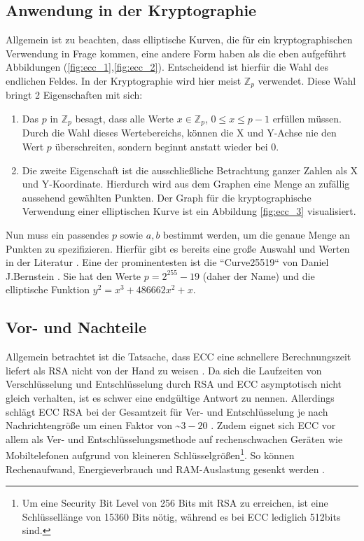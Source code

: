 \documentclass{scrreprt}
\begin{document}
\subsection{Anwendung in der Kryptographie}
Allgemein ist zu beachten, dass elliptische Kurven, die für ein kryptographischen Verwendung in Frage kommen, eine andere Form haben als die eben aufgeführt Abbildungen (\ref{fig:ecc_1},\ref{fig:ecc_2}). Entscheidend ist hierfür die Wahl des endlichen Feldes. In der Kryptographie wird hier meist $\mathbb{Z}_p$ verwendet. Diese Wahl bringt 2 Eigenschaften mit sich:
\begin{enumerate}
    \item Das $p$ in $\mathbb{Z}_p$ besagt, dass alle Werte $x \in \mathbb{Z}_p$, $0 \leq x \leq p-1$ erfüllen müssen. Durch die Wahl dieses Wertebereichs, können die X und Y-Achse nie den Wert $p$ überschreiten, sondern beginnt anstatt wieder bei 0.
    \item Die zweite Eigenschaft ist die ausschließliche Betrachtung ganzer Zahlen als X und Y-Koordinate. Hierdurch wird aus dem Graphen eine Menge an zufällig aussehend gewählten Punkten. Der Graph für die kryptographische Verwendung einer elliptischen Kurve ist ein Abbildung \ref{fig:ecc_3} visualisiert.
\end{enumerate}
Nun muss ein passendes $p$ sowie $a,b$ bestimmt werden, um die genaue Menge an Punkten zu spezifizieren. Hierfür gibt es bereits eine große Auswahl und Werten in der Literatur \cite{ecc-lochter2010elliptic}\cite{ecc-merkle2013elliptic}. Eine der prominentesten ist die ``Curve25519`` von Daniel J.Bernstein \cite{ecc-bernstein2006curve25519}. Sie hat den Werte $p=2^{255}-19$ (daher der Name) und die elliptische Funktion $y^2=x^3+486662x^2+x$.


\subsection{Vor- und Nachteile}
Allgemein betrachtet ist die Tatsache, dass ECC eine schnellere Berechnungszeit liefert als RSA nicht von der Hand zu weisen \cite{ecc-cloud2013elliptic}. Da sich die Laufzeiten von Verschlüsselung und Entschlüsselung durch RSA und ECC asymptotisch nicht gleich verhalten, ist es schwer eine endgültige Antwort zu nennen. Allerdings schlägt ECC RSA bei der Gesamtzeit für Ver- und Entschlüsselung je nach Nachrichtengröße um einen Faktor von \textasciitilde $3-20$ \cite{ecc-mahto2018performance}\cite{ecc-bao2022research}. Zudem eignet sich ECC vor allem als Ver- und Entschlüsselungsmethode auf rechenschwachen Geräten wie Mobiltelefonen aufgrund von kleineren Schlüsselgrößen\footnote{Um eine Security Bit Level von 256 Bits mit RSA zu erreichen, ist eine Schlüssellänge von 15360 Bits nötig, während es bei ECC lediglich 512bits sind.\cite{ecc-mahto2018performance}}. So können Rechenaufwand, Energieverbrauch und RAM-Auslastung gesenkt werden \cite{ecc-gupta2011ecc}.
\end{document}
